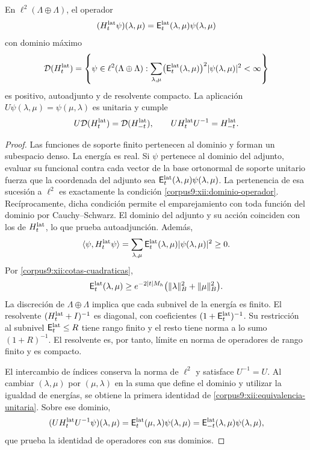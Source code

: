 \begin{theorem}
\label{corpus9:xii:operador-positivo}
En \(\ell^2(\Lambda\oplus\Lambda)\), el operador
\[
 (H_t^{\rm lat}\psi)(\lambda,\mu)
 =\mathsf E_t^{\rm lat}(\lambda,\mu)\psi(\lambda,\mu)
\]
con dominio máximo
\begin{equation}
 \mathcal D(H_t^{\rm lat})=
 \left\{\psi\in\ell^2(\Lambda\oplus\Lambda):
 \sum_{\lambda,\mu}\bigl(\mathsf E_t^{\rm lat}(\lambda,\mu)\bigr)^2
                  |\psi(\lambda,\mu)|^2<\infty\right\}
 \label{corpus9:xii:dominio-operador}
\end{equation}
es positivo, autoadjunto y de resolvente compacto. La aplicación
\(U\psi(\lambda,\mu)=\psi(\mu,\lambda)\) es unitaria y cumple
\begin{equation}
 U\mathcal D(H_t^{\rm lat})=\mathcal D(H_{-t}^{\rm lat}),\qquad
 UH_t^{\rm lat}U^{-1}=H_{-t}^{\rm lat}.
 \label{corpus9:xii:equivalencia-unitaria}
\end{equation}
\end{theorem}
\begin{proof}
Las funciones de soporte finito pertenecen al dominio y forman un
subespacio denso. La energía es real. Si \(\psi\) pertenece al dominio
del adjunto, evaluar su funcional contra cada vector de la base
ortonormal de soporte unitario fuerza que la coordenada del adjunto
sea \(\mathsf E_t^{\rm lat}(\lambda,\mu)\psi(\lambda,\mu)\).
La pertenencia de esa sucesión a \(\ell^2\) es exactamente la condición
\eqref{corpus9:xii:dominio-operador}. Recíprocamente, dicha condición
permite el emparejamiento con toda función del dominio por
Cauchy--Schwarz. El dominio del adjunto y su acción coinciden con los
de \(H_t^{\rm lat}\), lo que prueba autoadjunción. Además,
\[
 \langle\psi,H_t^{\rm lat}\psi\rangle
 =\sum_{\lambda,\mu}\mathsf E_t^{\rm lat}(\lambda,\mu)
                         |\psi(\lambda,\mu)|^2\geq0.
\]
Por \eqref{corpus9:xii:cotas-cuadraticas},
\[
 \mathsf E_t^{\rm lat}(\lambda,\mu)
 \geq e^{-2|t|M_h}
       \bigl(\|\lambda\|_B^2+\|\mu\|_B^2\bigr).
\]
La discreción de \(\Lambda\oplus\Lambda\) implica que cada subnivel
de la energía es finito. El resolvente \((H_t^{\rm lat}+I)^{-1}\)
es diagonal, con coeficientes \((1+\mathsf E_t^{\rm lat})^{-1}\).
Su restricción al subnivel \(\mathsf E_t^{\rm lat}\leq R\) tiene
rango finito y el resto tiene norma a lo sumo \((1+R)^{-1}\).
El resolvente es, por tanto, límite en norma de operadores de rango
finito y es compacto.

El intercambio de índices conserva la norma de \(\ell^2\) y satisface
\(U^{-1}=U\). Al cambiar \((\lambda,\mu)\) por \((\mu,\lambda)\)
en la suma que define el dominio y utilizar la igualdad de energías,
se obtiene la primera identidad de
\eqref{corpus9:xii:equivalencia-unitaria}. Sobre ese dominio,
\[
 (UH_t^{\rm lat}U^{-1}\psi)(\lambda,\mu)
 =\mathsf E_t^{\rm lat}(\mu,\lambda)\psi(\lambda,\mu)
 =\mathsf E_{-t}^{\rm lat}(\lambda,\mu)\psi(\lambda,\mu),
\]
que prueba la identidad de operadores con sus dominios.
\end{proof}

